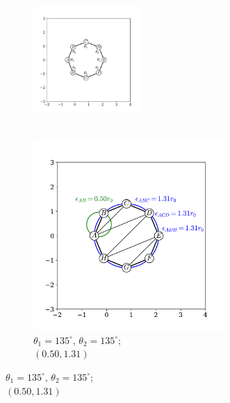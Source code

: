 \begin{figure}[tbp]
	\centering
     
      \begin{subfigure}[b]{0.45\textwidth}
         \centering
         \includegraphics[width=0.45\textwidth]{./figures/ph/sl_oct_b4_135x.pdf}
         \caption{\phantom{xxx} \\ \phantom{xxx}}
         \label{fig:b4a}
     \end{subfigure}
     \hfill
     \begin{subfigure}[b]{0.45\textwidth}
         \centering
         \includegraphics[width=0.8\textwidth]{./figures/ph/sl_oct_b4_135.pdf}
         \caption{$\theta_1=135^\circ$, $\theta_2=135^\circ$; \\$\left(0.50,1.31\right)$}
         \label{fig:b4b}
     \end{subfigure}
     

\end{figure}
